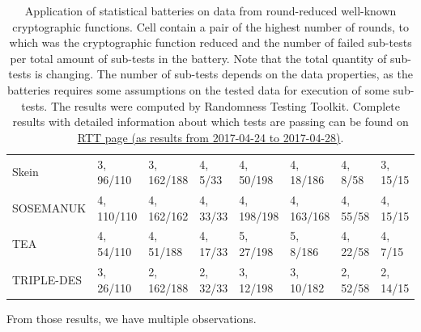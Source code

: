 \documentclass[
  print, %
  Table,   %
  nolof,     %
  nolot,     %
  11pt, %
  oneside  %
]{fithesis3}
\begin{document}
\begin{table}[H]
\begin{tabular}{l|p{1.8cm} p{1.8cm} p{1.8cm} p{1.8cm} p{1.8cm} p{1.8cm} p{1.8cm}}
Skein       & 3, 96/110 & 3, 162/188& 4, 5/33           & 4, 50/198                 & 4, 18/186     & 4, 8/58           & 3, 15/15              \\
SOSEMANUK   & 4, 110/110& 4, 162/162& 4, 33/33          & 4, 198/198                & 4, 163/168    & 4, 55/58          & 4, 15/15              \\
TEA         & 4, 54/110 & 4, 51/188 & 4, 17/33          & 5, 27/198                 & 5, 8/186      & 4, 22/58          & 4, 7/15               \\
TRIPLE-DES  & 3, 26/110 & 2, 162/188& 2, 32/33          & 3, 12/198                 & 3, 10/182     & 2, 52/58          & 2, 14/15              
\end{tabular}
\caption{Application of statistical batteries on data from round-reduced well-known cryptographic functions. Cell contain a pair of the highest number of rounds, to which was the cryptographic function reduced and the number of failed sub-tests per total amount of sub-tests in the battery. Note that the total quantity of sub-tests is changing. The number of sub-tests depends on the data properties, as the batteries requires some assumptions on the tested data for execution of some sub-tests. The results were computed by Randomness Testing Toolkit. Complete results with detailed information about which tests are passing can be found on \href{http://rtt.ics.muni.cz/ViewResults/?created_from=2017-04-24+12\%3A00\%3A00&created_to=2017-04-29+00\%3A00\%3A00}{RTT page (as results from 2017-04-24 to 2017-04-28)}.}
\label{table:res-batteries}
\end{table}

From those results, we have multiple observations.
\end{document}
